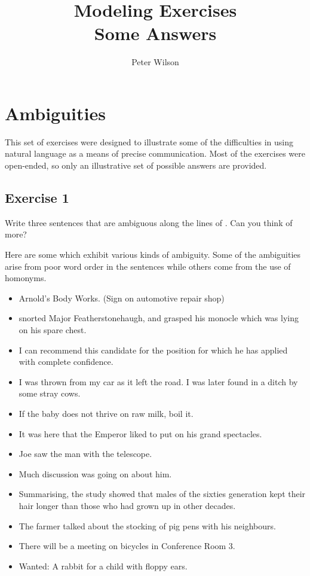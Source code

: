 \documentclass{article}
\title{Modeling Exercises\\Some Answers}
\author{Peter Wilson}
\date{}
\begin{document}
\maketitle

\tableofcontents

\clearpage


\section{Ambiguities}

    This set of exercises were designed to illustrate some of the
difficulties in using natural language as a means of precise communication.
Most of the exercises were open-ended, so only an illustrative set of possible
answers are provided.

\subsection{Exercise 1}

\begin{itshape}
 Write three sentences that are ambiguous along the lines of . Can you think of more?
\end{itshape}

    Here are some which exhibit various kinds of ambiguity. Some of the 
ambiguities arise from poor word order in the sentences while others come from
the use of homonyms.

\begin{itemize}
\item Arnold's Body Works. (Sign on automotive repair shop)
\item {} snorted Major Featherstonehaugh, and grasped his monocle which was
      lying on his spare chest.
\item I can recommend this candidate for the position for which he has applied 
      with complete confidence.
\item I was thrown from my car as it left the road. I was later found in a
      ditch by some stray cows.
\item If the baby does not thrive on raw milk, boil it.
\item It was here that the Emperor liked to put on his grand spectacles.
\item Joe saw the man with the telescope.
\item Much discussion was going on about him.
\item Summarising, the study showed that males of the sixties generation kept
      their hair longer than those who had grown up in other decades.
\item The farmer talked about the stocking of pig pens with his neighbours.
\item There will be a meeting on bicycles in Conference Room 3.
\item Wanted: A rabbit for a child with floppy ears.
\end{itemize}
\end{document}
